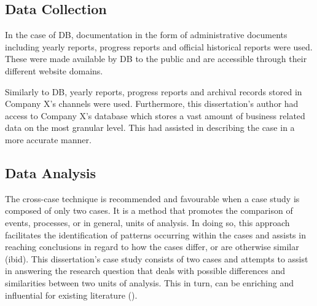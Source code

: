 \documentclass[11pt,a4paper]{article}
\begin{document}
{{\vspace{-2mm}

\subsection{Data Collection}
\label{data_collec}
\vspace{-1mm}
 \par
In the case of DB, documentation in the form of administrative documents including yearly reports, progress reports and official historical reports were used. These were made available by DB to the public and are accessible through their different website domains. \par
Similarly to DB, yearly reports, progress reports and archival records stored in Company X's channels were used. Furthermore, this dissertation's author had access to Company X's database which stores a vast amount of business related data on the most granular level. This had assisted in describing the case in a more accurate manner.
\vspace{-3mm}
\subsection{Data Analysis}
\label{data_ana}
\vspace{-1mm}
 \par
The cross-case technique is recommended and favourable when a case study is composed of only two cases. It is a method that promotes the comparison of events, processes, or in general, units of analysis. In doing so, this approach facilitates the identification of patterns occurring within the cases and assists in reaching conclusions in regard to how the cases differ, or are otherwise similar (ibid). This dissertation's case study consists of two cases and attempts to assist in answering the research question that deals with possible differences and similarities between two units of analysis. This in turn, can be enriching and influential for existing literature (\cite{gustafssonSingleCaseStudies2017}). \par

}}
\end{document}
